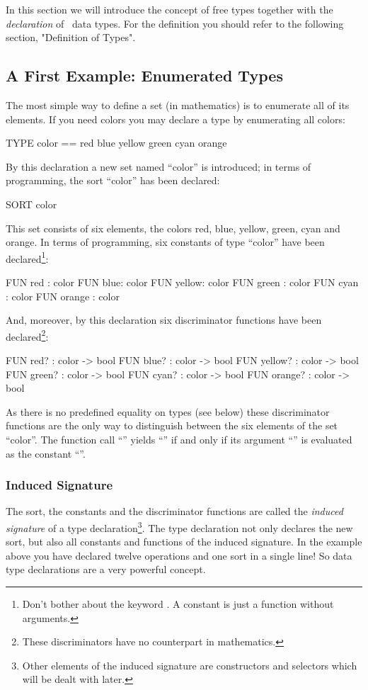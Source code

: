 In this section we will introduce the concept of free types together
with  the {\em declaration\/} of \opal\ data types.
For the definition you should refer to the following section,
"Definition of Types".

\subsection{A First Example: Enumerated Types}
\label{sec:enumType}
\advanced
 The most simple way to define a set (in mathematics) is to
enumerate all of its elements. 
If you need colors you may declare a type  by
enumerating all colors:
\begin{prog}
       TYPE color == red blue yellow green cyan orange
\end{prog}

By this declaration a new set named ``color'' is introduced; in terms of
programming, the sort ``color'' has been declared:
\begin{prog}
       SORT color
\end{prog}

This set consists of six elements, the colors red, blue, yellow,
green, cyan and  orange.
In terms of programming, six constants of type ``color'' have been
declared\footnote{Don't bother about the keyword . A constant is just a
function without arguments.}:
\begin{prog}
        FUN red : color
        FUN blue: color
        FUN yellow: color
        FUN green : color
        FUN cyan : color
        FUN orange : color
\end{prog}

And,  moreover, by this declaration six discriminator functions have
been declared\footnote{These discriminators have no
  counterpart in mathematics.}:
\begin{prog}
        FUN red? : color -> bool
        FUN blue? : color -> bool
        FUN yellow? : color -> bool
        FUN green? : color -> bool
        FUN cyan? : color -> bool
        FUN orange? : color -> bool
\end{prog}
As there is no predefined equality on types (see below) these discriminator
functions are the only way to distinguish between the six elements of
the set ``color''.  
The function call ``'' yields ``'' if and only
if its argument ``'' is evaluated as the constant ``''.


\subsubsection{Induced Signature}
\advanced
The sort, the constants and the discriminator functions are called the {\em
  induced signature\/} of a type declaration\footnote{Other elements
  of the induced signature are constructors and selectors which will
  be dealt with later.}.
The  type declaration not only declares the new sort, but also
all constants and functions of the induced signature.
In the example above you have declared twelve operations and one sort
in a single line! So data type declarations are a very powerful
concept.

